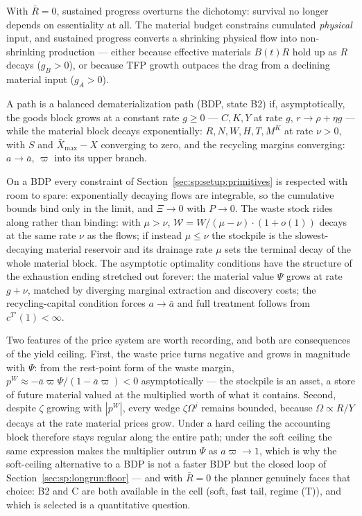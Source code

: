 With $\bar R=0$, sustained progress overturns the dichotomy: survival no longer depends on essentiality at all. The material budget constrains cumulated \emph{physical} input, and sustained progress converts a shrinking physical flow into non-shrinking production --- either because effective materials $B\left(t\right)R$ hold up as $R$ decays ($g_B>0$), or because TFP growth outpaces the drag from a declining material input ($g_A>0$).

\begin{definition}\label{def:lr:bdp}
A path is a balanced dematerialization path (BDP, state B2) if, asymptotically, the goods block grows at a constant rate $g\ge0$ --- $C,K,Y$ at rate $g$, $r\to\rho+\eta g$ --- while the material block decays exponentially: $R,N,W,H,T,M^K$ at rate $\nu>0$, with $S$ and $\bar X_{\max}-X$ converging to zero, and the recycling margins converging: $a\to\bar a$, $\varpi$ into its upper branch.
\end{definition}

On a BDP every constraint of Section~\ref{sec:sp:setup:primitives} is respected with room to spare: exponentially decaying flows are integrable, so the cumulative bounds bind only in the limit, and $\Xi\to0$ with $P\to0$. The waste stock rides along rather than binding: with $\mu>\nu$, $\mathcal W=W/\left(\mu-\nu\right)\cdot\left(1+o\left(1\right)\right)$ decays at the same rate $\nu$ as the flows; if instead $\mu\le\nu$ the stockpile is the slowest-decaying material reservoir and its drainage rate $\mu$ sets the terminal decay of the whole material block. The asymptotic optimality conditions have the structure of the exhaustion ending stretched out forever: the material value $\Psi$ grows at rate $g+\nu$, matched by diverging marginal extraction and discovery costs; the recycling-capital condition forces $a\to\bar a$ and full treatment follows from $c^{T\prime}\left(1\right)<\infty$.

Two features of the price system are worth recording, and both are consequences of the yield ceiling. First, the waste price turns negative and grows in magnitude with $\Psi$: from the rest-point form of the waste margin, $p^W\approx-\bar a\varpi\Psi/\left(1-\bar a\varpi\right)<0$ asymptotically --- the stockpile is an asset, a store of future material valued at the multiplied worth of what it contains. Second, despite $\zeta$ growing with $\left|p^W\right|$, every wedge $\zeta\Omega^j$ remains bounded, because $\Omega\propto R/Y$ decays at the rate material prices grow. Under a hard ceiling the accounting block therefore stays regular along the entire path; under the soft ceiling the same expression makes the multiplier outrun $\Psi$ as $a\varpi\to1$, which is why the soft-ceiling alternative to a BDP is not a faster BDP but the closed loop of Section~\ref{sec:sp:longrun:floor} --- and with $\bar R=0$ the planner genuinely faces that choice: B2 and C are both available in the cell (soft, fast tail, regime (T)), and which is selected is a quantitative question.

